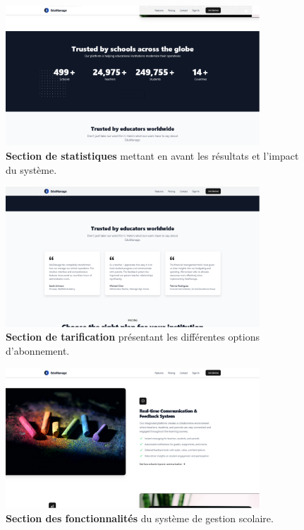 \begin{figure}[H]
  \centering
  \includegraphics[width=0.85\textwidth,keepaspectratio]{pfe-pics/landing/stats.png}
  \caption{\textbf{Section de statistiques} mettant en avant les résultats et l'impact du système.}
  \label{fig:landing_stats}
\end{figure}

\begin{figure}[H]
  \centering
  \includegraphics[width=0.85\textwidth,keepaspectratio]{pfe-pics/landing/Screenshot 2025-06-09 at 23-12-47 Vite React TS.png}
  \caption{\textbf{Section de tarification} présentant les différentes options d'abonnement.}
  \label{fig:landing_pricing}
\end{figure}

\begin{figure}[H]
  \centering
  \includegraphics[width=0.85\textwidth,keepaspectratio]{pfe-pics/landing/Screenshot 2025-06-09 at 23-12-17 Vite React TS.png}
  \caption{\textbf{Section des fonctionnalités} du système de gestion scolaire.}
  \label{fig:landing_features}
\end{figure}

